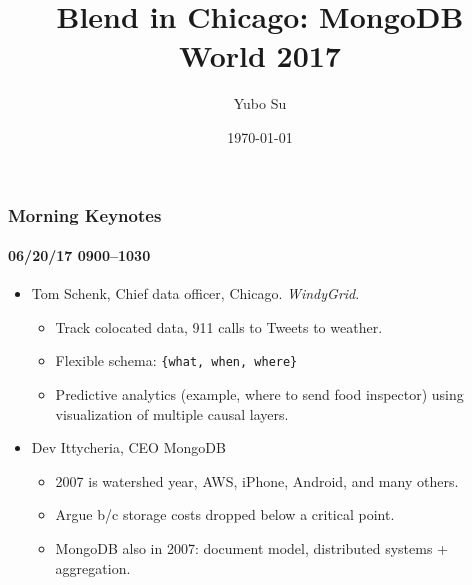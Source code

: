 \documentclass[xcolor=dvipsnames, 9pt]{beamer}
\title[MongoDB World 2017]{Blend in Chicago: MongoDB World 2017}
\author[Y. Su]{Yubo Su}
\institute[Blend]{Blend}
\date{\today}
\begin{document}
\frame{\titlepage}

\begin{frame}
    \frametitle{Morning Keynotes}
    \framesubtitle{06/20/17 0900--1030}

    \begin{itemize}
        \item Tom Schenk, Chief data officer, Chicago. \emph{WindyGrid}.
            \begin{itemize}
                \item Track colocated data, 911 calls to Tweets to
                    weather.
                \item Flexible schema: \texttt{\{what, when, where\}}
                \item Predictive analytics (example, where to send food
                    inspector) using visualization of multiple causal layers.
            \end{itemize}
        \item Dev Ittycheria, CEO MongoDB
            \begin{itemize}
                \item 2007 is watershed year, AWS, iPhone, Android, and
                    many others.
                \item Argue b/c storage costs dropped below a critical
                    point.
                \item MongoDB also in 2007: document model, distributed
                    systems + aggregation.
            \end{itemize}
    \end{itemize}
\end{frame}
\end{document}
